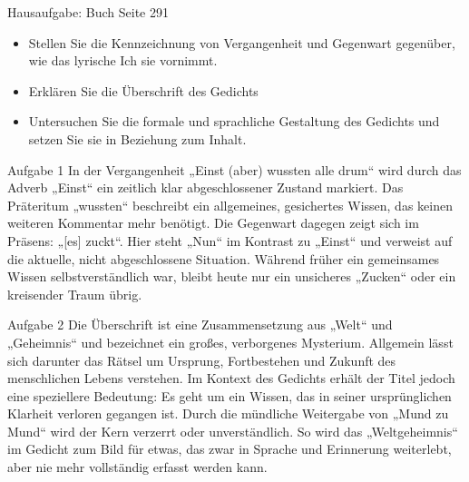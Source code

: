 \documentclass[11pt,a4paper,oneside]{article}
\begin{document}
	\newpage
	
	\begin{aufgabe}{Hausaufgabe: Buch Seite 291}
		\begin{itemize}[left=15mm]
			\item [Aufgabe 1:] Stellen Sie die Kennzeichnung von Vergangenheit und Gegenwart gegenüber, wie das lyrische Ich sie vornimmt. 
			\item [Aufgabe 2:] Erklären Sie die Überschrift des Gedichts 
			\item [Aufgabe 3:] Untersuchen Sie die formale und sprachliche Gestaltung des Gedichts und setzen Sie sie in Beziehung zum Inhalt.
		\end{itemize}
	\end{aufgabe}

	
	\begin{loesung}{Aufgabe 1}
	In der Vergangenheit „Einst (aber) wussten alle drum“ wird durch das Adverb „Einst“ ein zeitlich klar abgeschlossener Zustand markiert. Das Präteritum „wussten“ beschreibt ein allgemeines, gesichertes Wissen, das keinen weiteren Kommentar mehr benötigt. Die Gegenwart dagegen zeigt sich im Präsens: „[es] zuckt“. Hier steht „Nun“ im Kontrast zu „Einst“ und verweist auf die aktuelle, nicht abgeschlossene Situation. Während früher ein gemeinsames Wissen selbstverständlich war, bleibt heute nur ein unsicheres „Zucken“ oder ein kreisender Traum übrig.
	\end{loesung}
	
	\begin{loesung}{Aufgabe 2}
		Die Überschrift ist eine Zusammensetzung aus „Welt“ und „Geheimnis“ und bezeichnet ein großes, verborgenes Mysterium. Allgemein lässt sich darunter das Rätsel um Ursprung, Fortbestehen und Zukunft des menschlichen Lebens verstehen. Im Kontext des Gedichts erhält der Titel jedoch eine speziellere Bedeutung: Es geht um ein Wissen, das in seiner ursprünglichen Klarheit verloren gegangen ist. Durch die mündliche Weitergabe von „Mund zu Mund“ wird der Kern verzerrt oder unverständlich. So wird das „Weltgeheimnis“ im Gedicht zum Bild für etwas, das zwar in Sprache und Erinnerung weiterlebt, aber nie mehr vollständig erfasst werden kann.  
	\end{loesung}
	
\end{document}
